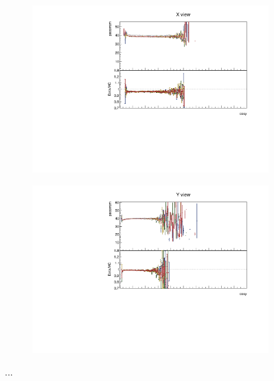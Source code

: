 \documentclass[12pt,a4paper]{article}
\begin{document}
\begin{figure}[!ht]
\begin{subfigure}{0.5\textwidth}
  \end{subfigure}
  \begin{subfigure}{0.5\textwidth}
    \includegraphics[width=\linewidth]{PlotsAngularDistribution/pecorrcm_cosy_x.pdf}
  \end{subfigure}
  \begin{subfigure}{0.5\textwidth}
    \includegraphics[width=\linewidth]{PlotsAngularDistribution/pecorrcm_cosy_y.pdf}
  \end{subfigure}
  \caption{...}
  \label{figAbsCalibCosY1}
\end{figure}
\end{document}
